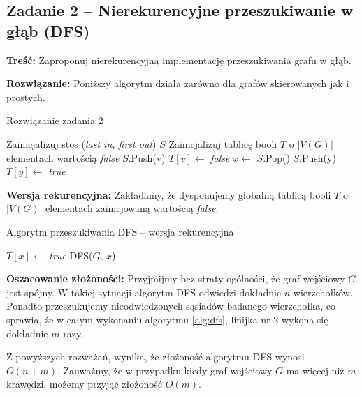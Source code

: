 \subsection{Zadanie 2 -- Nierekurencyjne przeszukiwanie w głąb (DFS)}
\textbf{Treść: } Zaproponuj nierekurencyjną implementację
przeszukiwania grafu w głąb.

\textbf{Rozwiązanie:}
Poniższy algorytm działa zarówno dla grafów skierowanych
jak i prostych.

\begin{algorithm}[H]
	\caption{Rozwiązanie zadania 2}\label{Zadanie22a}
	\begin{algorithmic}[1]
		\State Zainicjalizuj stos (\textit{last in, first out}) $S$
		\State Zainicjalizuj tablicę booli $T$ o $|V(G)|$ elementach wartością 
		\textit{false}
		\State $S$.Push(v)
		\State $T[v] \gets$ \textit{false}
		\State $x \gets$ $S$.Pop()
		\State $S$.Push(y)
		\State $T[y] \gets$ \textit{true} 
		\EndIf
		\EndWhile
		\EndWhile
		\EndProcedure
	\end{algorithmic}
\end{algorithm}

\textbf{Wersja rekurencyjna:} Zakładamy, że dysponujemy globalną
tablicą booli $T$ o $|V(G)|$ elementach zainicjowaną wartością 
\textit{false}.

\begin{algorithm}[H]
	\caption{Algorytm przeszukiwania DFS -- wersja rekurencyjna}\label{Zadanie22b}
	\begin{algorithmic}[1]
		\State $T[x] \gets$ \textit{true}
		\State DFS($G$, $x$)
		\EndIf
		\EndWhile
		\EndProcedure
	\end{algorithmic}
	\label{alg:dfs}
\end{algorithm}

\textbf{Oszacowanie złożoności:} Przyjmijmy bez straty ogólności, że graf wejściowy
$G$ jest spójny. W takiej sytuacji algorytm DFS odwiedzi dokładnie $n$ wierzchołków. Ponadto
przeszukujemy nieodwiedzonych sąsiadów badanego wierzchołka, co sprawia, że w całym
wykonaniu algorytmu \ref{alg:dfs}, linijka nr 2 wykona się dokładnie $m$ razy.

Z powyższych rozważań, wynika, że złożoność algorytmu DFS wynosi $O(n + m)$. Zauważmy, że
w przypadku kiedy graf wejściowy $G$ ma więcej niż $m$ krawędzi, możemy przyjąć złożoność $O(m)$.

